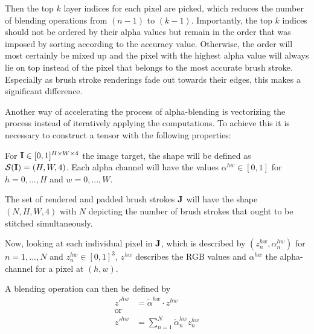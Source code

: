 Then the top $k$ layer indices for each pixel are picked, which reduces the number
of blending operations from $(n-1)$ to $(k-1)$.
Importantly, the top $k$ indices should not be ordered by their alpha values but
remain in the order that was imposed by sorting according to the accuracy value.
Otherwise, the order will most certainly be mixed up and the pixel with the highest
alpha value will always lie on top instead of the pixel that belongs to the most
accurate brush stroke.
Especially as brush stroke renderings fade out towards their edges, this makes a
significant difference.


Another way of accelerating the process of alpha-blending is vectorizing the process
instead of iteratively applying the computations.
To achieve this it is necessary to construct a tensor with the following properties:

For $\mathbf{I} \in [0, 1]^{H \times W \times 4} $ the image target, the shape will be defined
as $\mathcal{S}(\mathbf{I}) = (H, W, 4)$.
Each alpha channel will have the values $\alpha^{hw} \in [0, 1]$ for $h = 0, ..., H$ and $w = 0, ..., W$.

The set of rendered and padded brush strokes $\mathbf{J}$ will have the shape $(N, H, W, 4)$
with $N$ depicting the number of brush strokes that ought to be stitched simultaneously.

Now, looking at each individual pixel in $\mathbf{J}$, which is described by $(z^{hw}_n, \alpha^{hw}_n)$
for $n = 1, ..., N$ and $z^{hw}_n \in [0, 1]^{3}$, $z^{hw}$ describes the RGB values
and $\alpha^{hw}$ the alpha-channel for a pixel at $(h, w)$.

A blending operation can then be defined by
\begin{align}
    z'^{hw} & = \tilde{\alpha}^{hw} \cdot z^{hw} \\
    \text{or} \\
    z'^{hw} & = \sum_{n=1}^N \tilde{\alpha}^{hw}_n  z^{hw}_n \\
\end{align}

